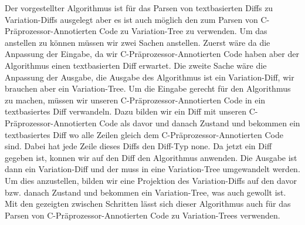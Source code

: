 Der vorgestellter Algorithmus ist für das Parsen von textbasierten Diffs zu Variation-Diffs ausgelegt aber es ist auch möglich den zum Parsen von C-Präprozessor-Annotierten Code zu Variation-Tree zu verwenden. Um das anstellen zu können müssen wir zwei Sachen anstellen. Zuerst wäre da die Anpassung der Eingabe, da wir C-Präprozessor-Annotierten Code haben aber der Algorithmus einen textbasierten Diff erwartet. Die zweite Sache wäre die Anpassung der Ausgabe, die Ausgabe des Algorithmus ist ein Variation-Diff, wir brauchen aber ein Variation-Tree. Um die Eingabe gerecht für den Algorithmus zu machen, müssen wir unseren C-Präprozessor-Annotierten Code in ein textbasiertes Diff verwandeln. Dazu bilden wir ein Diff mit unseren C-Präprozessor-Annotierten Code als davor und danach Zustand und bekommen ein textbasiertes Diff wo alle Zeilen gleich dem C-Präprozessor-Annotierten Code sind. Dabei hat jede Zeile dieses Diffs den Diff-Typ none. Da jetzt ein Diff gegeben ist, konnen wir auf den Diff den Algorithmus anwenden. Die Ausgabe ist dann ein Variation-Diff und der muss in eine Variation-Tree umgewandelt werden. Um dies anzustellen, bilden wir eine Projektion des Variation-Diffs auf den davor bzw. danach Zustand und bekommen ein Variation-Tree, was auch gewollt ist. Mit den gezeigten zwischen Schritten lässt sich dieser Algorithmus auch für das Parsen von C-Präprozessor-Annotierten Code zu Variation-Trees verwenden.\\


